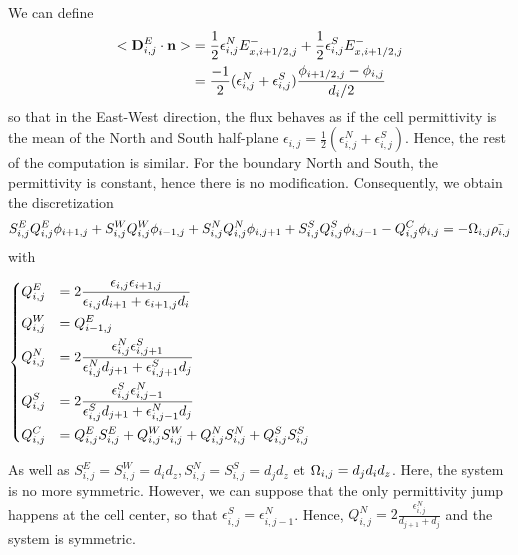     We can define
    \begin{align}
    <{\mathbf D}^E_{i,j} \cdot {\mathbf n} >&= \frac{1}{2} \epsilon_{i,j}^N E_{x, i+1/2,j}^- + \frac{1}{2} \epsilon_{i,j}^S E_{x, i+1/2,j}^-\\
     &= \frac{-1}{2} (\epsilon_{i,j}^N + \epsilon_{i,j}^S) \frac{\phi_{i+1/2,j} - \phi_{i,j}}{d_i/2}
     \label{eq-flux}
    \end{align}
    so that in the East-West direction, the flux behaves as if the cell permittivity is the mean of the North and South half-plane  $\epsilon_{i,j} = \frac{1}{2} (\epsilon_{i,j}^N + \epsilon_{i,j}^S)$.
    Hence, the rest of the computation is similar.
    For the boundary North and South, the permittivity is constant, hence there is no modification.
    Consequently, we obtain the discretization
    \begin{equation}
    S^E_{i,j} Q^E_{i,j} \phi_{i+1,j} + S^W_{i,j} Q^W_{i,j} \phi_{i-1,j} + S^N_{i,j} Q^N_{i,j} \phi_{i,j+1} + S^S_{i,j} Q^S_{i,j} \phi_{i,j-1} - Q^C_{i,j} \phi_{i,j} = - \Omega_{i,j} \bar{\rho_{i,j}}
    \label{eq-descretPoissoncentered}
    \end{equation}
    with
    \begin{center}
     $\begin{dcases}
     Q^E_{i,j} &= 2\frac{\epsilon_{i,j} \epsilon_{i+1,j}}{\epsilon_{i,j} d_{i+1} + \epsilon_{i+1,j} d_i} \\
     Q^W_{i,j} &= Q^E_{i-1,j} \\
     Q^N_{i,j} &= 2\frac{\epsilon_{i,j}^N \epsilon_{i,j+1}^S}{\epsilon_{i,j}^N d_{j+1} + \epsilon_{i,j+1}^S d_{j}}\\
     Q^S_{i,j} &= 2\frac{\epsilon_{i,j}^S \epsilon_{i,j-1}^N}{\epsilon_{i,j}^S d_{j+1} + \epsilon_{i,j-1}^N d_{j}} \\
     Q^C_{i,j} &= Q^E_{i,j}S^E_{i,j}+Q^W_{i,j}S^W_{i,j}+Q^N_{i,j}S^N_{i,j}+Q^S_{i,j}S^S_{i,j}
     \end{dcases}$
    \end{center}

    As well as $S^E_{i,j} = S^W_{i,j} =d_id_z, S^N_{i,j} = S^S_{i,j}= d_jd_z$ et $\Omega_{i,j} = d_jd_id_z$.
    Here, the system is no more symmetric.
    However, we can suppose that the only permittivity jump happens at the cell center, so that  $\epsilon_{i,j}^S = \epsilon_{i,j-1}^N$.
    Hence, $Q^N_{i,j} = 2\frac{\epsilon_{i,j}^N}{ d_{j+1} + d_{j}}$ and the system is symmetric.

